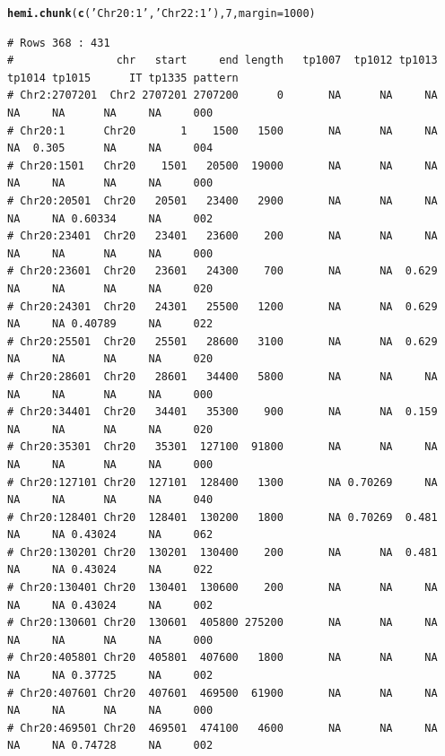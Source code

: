 \documentclass{article}\usepackage[]{graphicx}\usepackage[]{color}
\makeatletter
\newcommand{\hlnum}[1]{\textcolor[rgb]{0.686,0.059,0.569}{#1}}%
\newcommand{\hlstr}[1]{\textcolor[rgb]{0.192,0.494,0.8}{#1}}%
\newcommand{\hlstd}[1]{\textcolor[rgb]{0.345,0.345,0.345}{#1}}%
\newcommand{\hlkwc}[1]{\textcolor[rgb]{0.333,0.667,0.333}{#1}}%
\newcommand{\hlkwd}[1]{\textcolor[rgb]{0.737,0.353,0.396}{\textbf{#1}}}%
\newenvironment{kframe}{%
 \def\at@end@of@kframe{}%
 \ifinner\ifhmode%
  \def\at@end@of@kframe{\end{minipage}}%
  \begin{minipage}{\columnwidth}%
 \fi\fi%
 \def\FrameCommand##1{\hskip\@totalleftmargin \hskip-\fboxsep
 \colorbox{shadecolor}{##1}\hskip-\fboxsep
     \hskip-\linewidth \hskip-\@totalleftmargin \hskip\columnwidth}%
 \MakeFramed {\advance\hsize-\width
   \@totalleftmargin\z@ \linewidth\hsize
   \@setminipage}}%
 {\par\unskip\endMakeFramed%
 \at@end@of@kframe}
\newenvironment{knitrout}{}{} %
\makeatother
\begin{document}
\begin{knitrout}\footnotesize
{}\color{fgcolor}\begin{kframe}
\begin{alltt}
\hlkwd{hemi.chunk}\hlstd{(}\hlkwd{c}\hlstd{(}\hlstr{'Chr20:1'}\hlstd{,}\hlstr{'Chr22:1'}\hlstd{),}\hlnum{7}\hlstd{,}\hlkwc{margin}\hlstd{=}\hlnum{1000}\hlstd{)}
\end{alltt}
\begin{verbatim}
# Rows 368 : 431 
#                chr   start     end length   tp1007  tp1012 tp1013  tp1014 tp1015      IT tp1335 pattern
# Chr2:2707201  Chr2 2707201 2707200      0       NA      NA     NA      NA     NA      NA     NA     000
# Chr20:1      Chr20       1    1500   1500       NA      NA     NA      NA  0.305      NA     NA     004
# Chr20:1501   Chr20    1501   20500  19000       NA      NA     NA      NA     NA      NA     NA     000
# Chr20:20501  Chr20   20501   23400   2900       NA      NA     NA      NA     NA 0.60334     NA     002
# Chr20:23401  Chr20   23401   23600    200       NA      NA     NA      NA     NA      NA     NA     000
# Chr20:23601  Chr20   23601   24300    700       NA      NA  0.629      NA     NA      NA     NA     020
# Chr20:24301  Chr20   24301   25500   1200       NA      NA  0.629      NA     NA 0.40789     NA     022
# Chr20:25501  Chr20   25501   28600   3100       NA      NA  0.629      NA     NA      NA     NA     020
# Chr20:28601  Chr20   28601   34400   5800       NA      NA     NA      NA     NA      NA     NA     000
# Chr20:34401  Chr20   34401   35300    900       NA      NA  0.159      NA     NA      NA     NA     020
# Chr20:35301  Chr20   35301  127100  91800       NA      NA     NA      NA     NA      NA     NA     000
# Chr20:127101 Chr20  127101  128400   1300       NA 0.70269     NA      NA     NA      NA     NA     040
# Chr20:128401 Chr20  128401  130200   1800       NA 0.70269  0.481      NA     NA 0.43024     NA     062
# Chr20:130201 Chr20  130201  130400    200       NA      NA  0.481      NA     NA 0.43024     NA     022
# Chr20:130401 Chr20  130401  130600    200       NA      NA     NA      NA     NA 0.43024     NA     002
# Chr20:130601 Chr20  130601  405800 275200       NA      NA     NA      NA     NA      NA     NA     000
# Chr20:405801 Chr20  405801  407600   1800       NA      NA     NA      NA     NA 0.37725     NA     002
# Chr20:407601 Chr20  407601  469500  61900       NA      NA     NA      NA     NA      NA     NA     000
# Chr20:469501 Chr20  469501  474100   4600       NA      NA     NA      NA     NA 0.74728     NA     002

\end{verbatim}
\end{kframe}
\end{knitrout}
\end{document}
